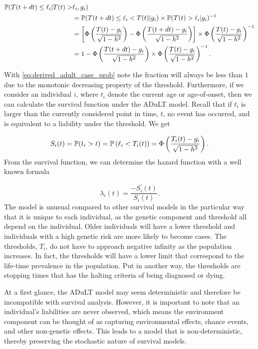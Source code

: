 \begin{align}
	\mathbb{P}(T(t + dt) \leq \ell_i | T(t) >& \ell_i, g_i)  \\
	&=\mathbb{P}(T(t + dt) \leq \ell_i < T(t)|g_i) \times \mathbb{P}(T(t) > \ell_i | g_i)^{-1}  \\
	&=
	\left[\Phi\left( \dfrac{T(t) - g_i}{\sqrt{1 - h^2}}\right) - \Phi\left( \dfrac{T(t + dt) - g_i}{\sqrt{1 - h^2}}\right)\right] \times
	\Phi \left( \dfrac{T(t) - g_i}{\sqrt{1 - h^2}}\right)^{-1} \\
	&=
	1 - \Phi\left( \dfrac{T(t + dt) - g_i}{\sqrt{1 - h^2}}\right) \times \Phi\left( \dfrac{T(t) - g_i}{\sqrt{1 - h^2}}\right)^{-1} \label{eq:derived_adult_case_prob}.
\end{align}

With \cref{eq:derived_adult_case_prob} note the fraction will always be less than $ 1 $ due to the monotonic decreasing property of the threshold. Furthermore, if we consider an individual $ i $, where $ t_i $ denote the current age or age-of-onset, then we can calculate the survival function under the ADuLT model. Recall that if $ t_i $ is larger than the currently considered point in time, $ t $, no event has occurred, and is equivalent to a liability under the threshold. We get


\begin{equation}
S_i(t) = \mathbb{P}(t_i > t) = \mathbb{P} \left(\ell_i < T_i(t) \right) = \Phi\left(\dfrac{T_i(t) - g_i}{\sqrt{1 - h^2}}\right).
\end{equation}
From the survival function, we can determine the hazard function with a well known formula 

\begin{equation}
\lambda_i(t) = \dfrac{-S_i^{'}(t)}{S_i(t)}.
\end{equation}
The model is unusual compared to other survival models in the particular way that it is unique to each individual, as the genetic component and threshold all depend on the individual. Older individuals will have a lower threshold and individuals with a high genetic risk are more likely to become cases. The thresholds, $ T_i $, do not have to approach negative infinity as the population increases. In fact, the thresholds will have a lower limit that correspond to the life-time prevalence in the population. Put in another way, the thresholds are stopping times that has the halting criteria of being diagnosed or dying.

At a first glance, the ADuLT model may seem deterministic and therefore be incompatible with survival analysis. However, it is important to note that an individual's liabilities are never observed, which means the environment component can be thought of as capturing environmental effects, chance events, and other non-genetic effects. This leads to a model that is non-deterministic, thereby preserving the stochastic nature of survival models.
